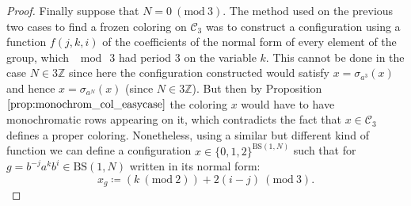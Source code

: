 \documentclass[letterpaper,10pt]{article}
\theoremstyle{plain}
\newcommand{\BS}[1][N]{\mathrm{BS}(1,#1)}
\begin{document}
\begin{proof}
	
	Finally suppose that $N=0 \ (\mathrm{mod} \ 3)$. The method used on the previous two cases to find a frozen coloring on $\mathcal{C}_3$ was to construct a configuration using a function $f(j,k,i)$ of the coefficients of the normal form of every element of the group, which $\mod \ 3$ had period $3$ on the variable $k$. This cannot be done in the case $N\in 3\mathbb{Z }$ since here the configuration constructed would satisfy $x=\sigma_{a^3}(x)$ and hence $x=\sigma_{a^N}(x)$ (since $N\in 3\mathbb{Z}$). But then by Proposition $\ref{prop:monochrom_col_easycase}$ the coloring $x$ would have to have monochromatic rows appearing on it, which contradicts the fact that $x\in \mathcal{C}_3$ defines a proper coloring. Nonetheless, using a similar but different kind of function we can define a configuration $x\in \{0,1,2\}^{\BS}$ such that for $g=b^{-j}a^k b^i\in \BS$ written in its normal form:
	$$
	x_g\coloneqq (k \ (\mathrm{mod} \ 2)) + 2(i-j) \ (\mathrm{mod} \ 3).
	$$
	

\end{proof}
\end{document}
